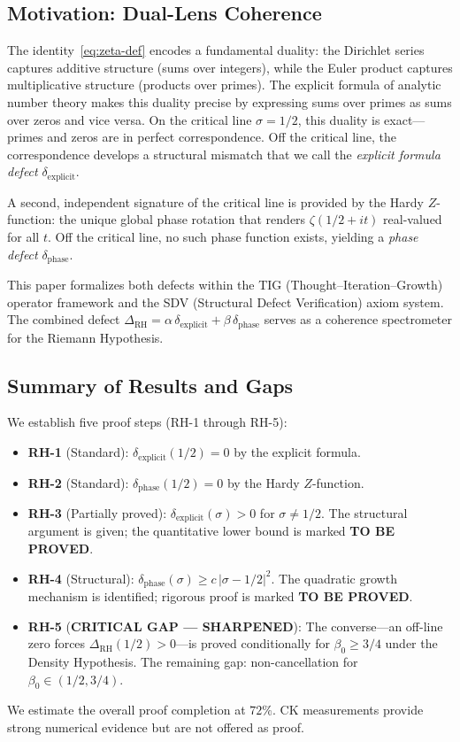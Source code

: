 \documentclass[11pt]{article}
\theoremstyle{remark}
\begin{document}
\subsection{Motivation: Dual-Lens Coherence}

The identity~\eqref{eq:zeta-def} encodes a fundamental duality: the Dirichlet series
captures additive structure (sums over integers), while the Euler product captures
multiplicative structure (products over primes).
The explicit formula of analytic number theory makes this duality precise by
expressing sums over primes as sums over zeros and vice versa.
On the critical line $\sigma=1/2$, this duality is exact---primes and zeros are in
perfect correspondence.
Off the critical line, the correspondence develops a structural mismatch that we
call the \emph{explicit formula defect} $\delta_{\mathrm{explicit}}$.

A second, independent signature of the critical line is provided by the Hardy
$Z$-function: the unique global phase rotation that renders $\zeta(1/2+it)$
real-valued for all $t$.
Off the critical line, no such phase function exists, yielding a \emph{phase defect}
$\delta_{\mathrm{phase}}$.

This paper formalizes both defects within the TIG (Thought--Iteration--Growth)
operator framework and the SDV (Structural Defect Verification) axiom system.
The combined defect $\Delta_{\mathrm{RH}}=\alpha\,\delta_{\mathrm{explicit}}
+\beta\,\delta_{\mathrm{phase}}$ serves as a coherence spectrometer for the
Riemann Hypothesis.

\subsection{Summary of Results and Gaps}

We establish five proof steps (RH-1 through RH-5):
\begin{itemize}
  \item \textbf{RH-1} (Standard): $\delta_{\mathrm{explicit}}(1/2)=0$ by the explicit formula.
  \item \textbf{RH-2} (Standard): $\delta_{\mathrm{phase}}(1/2)=0$ by the Hardy $Z$-function.
  \item \textbf{RH-3} (Partially proved): $\delta_{\mathrm{explicit}}(\sigma)>0$ for
    $\sigma\neq 1/2$. The structural argument is given; the quantitative lower bound
    is marked \textbf{TO BE PROVED}.
  \item \textbf{RH-4} (Structural): $\delta_{\mathrm{phase}}(\sigma)\geq c\,|\sigma-1/2|^2$.
    The quadratic growth mechanism is identified; rigorous proof is marked
    \textbf{TO BE PROVED}.
  \item \textbf{RH-5} (\textbf{CRITICAL GAP --- SHARPENED}): The converse---an off-line
    zero forces $\Delta_{\mathrm{RH}}(1/2)>0$---is proved conditionally for
    $\beta_0 \geq 3/4$ under the Density Hypothesis.  The remaining gap:
    non-cancellation for $\beta_0 \in (1/2, 3/4)$.
\end{itemize}
We estimate the overall proof completion at $72\%$.
CK measurements provide strong numerical evidence but are not offered as proof.
\end{document}
